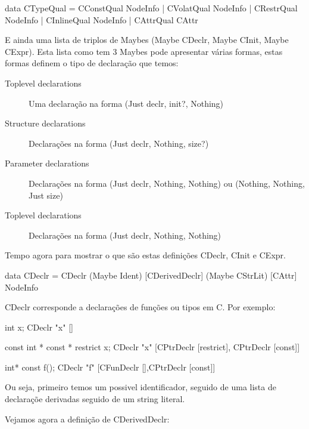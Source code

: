 \begin{haskell}
data CTypeQual = CConstQual NodeInfo
               | CVolatQual NodeInfo
               | CRestrQual NodeInfo
               | CInlineQual NodeInfo
               | CAttrQual  CAttr
\end{haskell}

E ainda uma lista de triplos de \textrm{Maybe}s (Maybe CDeclr, Maybe CInit, Maybe CExpr).
Esta lista como tem 3 Maybes pode apresentar várias formas, estas formas definem o tipo de declaração que temos:

\begin{description}
\item[Toplevel declarations] Uma declaração na forma (Just declr, init?, Nothing)
\item[Structure declarations] Declarações na forma (Just declr, Nothing, size?)
\item[Parameter declarations] Declarações na forma (Just declr, Nothing, Nothing) ou (Nothing, Nothing, Just size)
\item[Toplevel declarations] Declarações na forma (Just declr, Nothing, Nothing)
\end{description}

Tempo agora para mostrar o que são estas definições \textrm{CDeclr}, \textrm{CInit} e \textrm{CExpr}.

\begin{haskell}
data CDeclr = CDeclr (Maybe Ident) [CDerivedDeclr] (Maybe CStrLit) [CAttr] NodeInfo
\end{haskell}
\textrm{CDeclr} corresponde a declarações de funções ou tipos em C. Por exemplo:

\begin{code_files}
int x;
CDeclr "x" []
\end{code_files}

\begin{code_files}
const int * const * restrict x;
CDeclr "x" [CPtrDeclr [restrict], CPtrDeclr [const]]
\end{code_files}

\begin{code_files}
int* const f();
CDeclr "f" [CFunDeclr [],CPtrDeclr [const]]
\end{code_files}

Ou seja, primeiro temos um possivel identificador, seguido de uma lista de 
declaraçõe derivadas seguido de um string literal.

Vejamos agora a definição de \textrm{CDerivedDeclr}:

